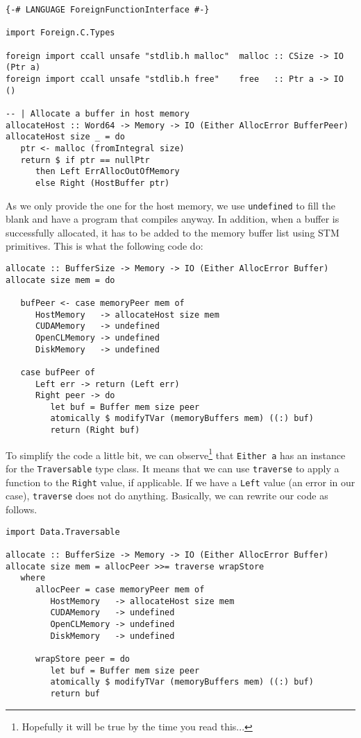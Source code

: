 \begin{lstlisting}
{-# LANGUAGE ForeignFunctionInterface #-}

import Foreign.C.Types

foreign import ccall unsafe "stdlib.h malloc"  malloc :: CSize -> IO (Ptr a)
foreign import ccall unsafe "stdlib.h free"    free   :: Ptr a -> IO ()

-- | Allocate a buffer in host memory
allocateHost :: Word64 -> Memory -> IO (Either AllocError BufferPeer)
allocateHost size _ = do
   ptr <- malloc (fromIntegral size)
   return $ if ptr == nullPtr
      then Left ErrAllocOutOfMemory
      else Right (HostBuffer ptr)
\end{lstlisting}

As we only provide the one for the host memory, we use \texttt{undefined} to
fill the blank and have a program that compiles anyway. In addition, when a
buffer is successfully allocated, it has to be added to the memory buffer list
using STM primitives. This is what the following code do:

\begin{lstlisting}
allocate :: BufferSize -> Memory -> IO (Either AllocError Buffer)
allocate size mem = do

   bufPeer <- case memoryPeer mem of
      HostMemory   -> allocateHost size mem
      CUDAMemory   -> undefined
      OpenCLMemory -> undefined
      DiskMemory   -> undefined

   case bufPeer of
      Left err -> return (Left err)
      Right peer -> do
         let buf = Buffer mem size peer
         atomically $ modifyTVar (memoryBuffers mem) ((:) buf)
         return (Right buf)
\end{lstlisting}

To simplify the code a little bit, we can observe\footnote{Hopefully it will be
true by the time you read this...} that \texttt{Either a} has an instance for
the \texttt{Traversable} type class. It means that we can use \texttt{traverse}
to apply a function to the \texttt{Right} value, if applicable. If we have a
\texttt{Left} value (an error in our case), \texttt{traverse} does not do
anything. Basically, we can rewrite our code as follows.

\begin{lstlisting}
import Data.Traversable

allocate :: BufferSize -> Memory -> IO (Either AllocError Buffer)
allocate size mem = allocPeer >>= traverse wrapStore
   where
      allocPeer = case memoryPeer mem of
         HostMemory   -> allocateHost size mem
         CUDAMemory   -> undefined
         OpenCLMemory -> undefined
         DiskMemory   -> undefined

      wrapStore peer = do
         let buf = Buffer mem size peer
         atomically $ modifyTVar (memoryBuffers mem) ((:) buf)
         return buf
\end{lstlisting}

